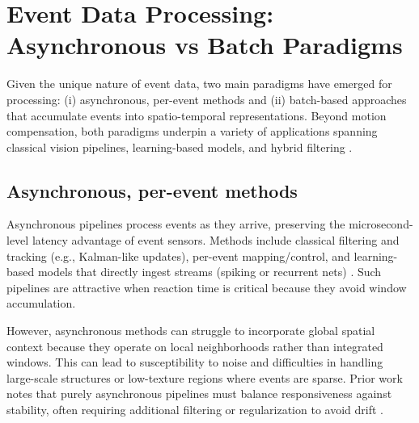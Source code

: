 \section{Event Data Processing: Asynchronous vs Batch Paradigms}

Given the unique nature of event data, two main paradigms have emerged for processing: (i) asynchronous, per-event methods and (ii) batch-based approaches that accumulate events into spatio-temporal representations. Beyond motion compensation, both paradigms underpin a variety of applications spanning classical vision pipelines, learning-based models, and hybrid filtering \cite{Gallego2020Survey}.

\subsection{Asynchronous, per-event methods}
Asynchronous pipelines process events as they arrive, preserving the microsecond-level latency advantage of event sensors. Methods include classical filtering and tracking (e.g., Kalman-like updates), per-event mapping/control, and learning-based models that directly ingest streams (spiking or recurrent nets) \cite{Maqueda2018Steering,Gallego2020Survey}. Such pipelines are attractive when reaction time is critical because they avoid window accumulation.

However, asynchronous methods can struggle to incorporate global spatial context because they operate on local neighborhoods rather than integrated windows. This can lead to susceptibility to noise and difficulties in handling large-scale structures or low-texture regions where events are sparse. Prior work notes that purely asynchronous pipelines must balance responsiveness against stability, often requiring additional filtering or regularization to avoid drift \cite{Scheerlinck2021Thesis,Gallego2020Survey}.

